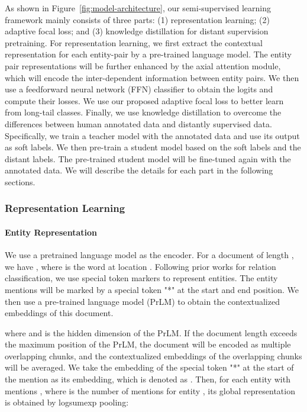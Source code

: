 \documentclass[11pt]{article}
\begin{document}
As shown in Figure~\ref{fig:model-architecture}, our semi-supervised learning framework mainly consists of three parts: (1) representation learning; (2) adaptive focal loss; and (3) knowledge distillation for distant supervision pretraining. For representation learning, we first extract the contextual representation for each entity-pair by a pre-trained language model. The entity pair representations will be further enhanced by the axial attention module, which will encode the inter-dependent information between entity pairs. We then use a feedforward neural network (FFN) classifier to obtain the logits and compute their losses. We use our proposed adaptive focal loss to better learn from long-tail classes. Finally, we use knowledge distillation to overcome the differences between human annotated data and distantly supervised data. Specifically, we train a teacher model with the annotated data and use its output as soft labels. We then pre-train a student model based on the soft labels and the distant labels. The pre-trained student model will be fine-tuned again with the annotated data. We will describe the details for each part in the following sections.



\subsubsection{Representation Learning}
\paragraph{Entity Representation} We use a pretrained language model as the encoder. For a document  of length , we have , where  is the word at location . Following prior works for relation classification, we use special token markers to represent entities. The entity mentions will be marked by a special token "*" at the start and end position. We then use a pre-trained language model (PrLM) to obtain the contextualized embeddings  of this document. 

where  and  is the hidden dimension of the PrLM. If the document length exceeds the maximum position of the PrLM, the document will be encoded as multiple overlapping chunks, and the contextualized embeddings of the overlapping chunks will be averaged. We take the embedding of the special token "*" at the start of the mention as its embedding, which is denoted as . Then, for each entity  with mentions , where  is the number of mentions for entity , its global representation is obtained by logsumexp pooling:
\end{document}
